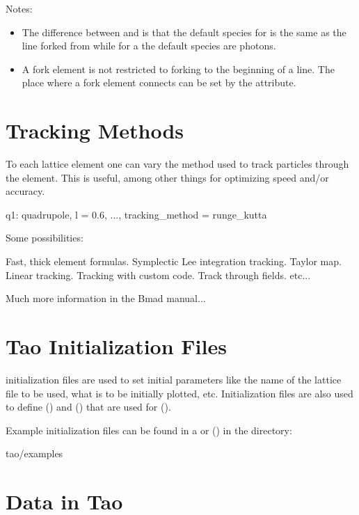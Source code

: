 \documentclass{hitec}
\newcommand{\Section}[1]{\section{#1}\vspace*{-1ex}}
\begin{document}
Notes:
\begin{itemize}
\item The difference between  and  is that the default species for  is
the same as the line forked from while for a  the default species are photons.
\item A fork element is not restricted to forking to the beginning of a line. 
The place where a fork element connects can be set by the  attribute.
\end{itemize}

\Section{Tracking Methods}

To each lattice element one can vary the method used to track particles through the element. This is
useful, among other things for optimizing speed and/or accuracy.
\begin{code}
    q1: quadrupole, l = 0.6, ..., tracking_method = runge_kutta
\end{code}

Some possibilities:
\begin{code}
   Fast, thick element formulas.
    Symplectic Lee integration tracking.
          Taylor map.
          Linear tracking.
          Tracking with custom code.
     Track through fields.
etc...
\end{code}

Much more information in the Bmad manual...


\Section{Tao Initialization Files}
\label{s:init.file}

\tao initialization files are used to set initial parameters like the name of the lattice file to be
used, what is to be initially plotted, etc. Initialization files are also used to define 
() and  () that are used for  ().

Example \tao initialization files can be found in a  or 
() in the directory:
\begin{code}
  tao/examples
\end{code}


\Section{Data in Tao}
\label{s:data}
\end{document}
